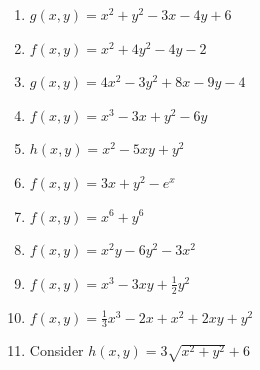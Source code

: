 \documentclass[12pt]{article}
\newif\ifans
\begin{document}
\begin{enumerate}

\item $g(x,y)=x^2+y^2-3x-4y+6$ 

\ifans{\fbox{Relative minimum at $\left(\frac{3}{2},2\right)$ }} \fi

\item $f(x,y)=x^2+4y^2-4y-2$ 

\ifans{\fbox{Relative minimum at $\left(0,\frac{1}{2}\right)$}} \fi

\item $g(x,y)=4x^2-3y^2+8x-9y-4$ 

\ifans{\fbox{Saddle point at $\left(-1,-\frac{3}{2}\right)$}} \fi

\item $f(x,y)=x^3-3x+y^2-6y$

\ifans{\fbox{Relative minimum at $(1,3)$; Saddle point at $(-1,3)$}} \fi

\item $h(x,y)=x^2-5xy+y^2$ 

\ifans{\fbox{Saddle point at $(0,0)$}} \fi

\item $f(x,y)=3x+y^2-e^x$

\ifans{\fbox{Saddle point at $(\ln{3},0)$}} \fi

\item $f(x,y)=x^6+y^6$

\ifans{\fbox{Relative minimum at $(0,0)$}} \fi

\item $f(x,y)=x^2y-6y^2-3x^2$

\ifans{\fbox{Relative maximum at $(0,0)$; Saddle points at $(6,3)$ and $(-6,3)$; Detailed Solution: \textcolor{blue}{\href{http://www.math.drexel.edu/classes/Calculus/resources/Math200HW/Solutions/15_200_Extrema_08.pdf}{Here}}}} \fi

\item $f(x,y)=x^3-3xy+\frac{1}{2}y^2$

\ifans{\fbox{Relative minimum at $(3,9)$; Saddle point at $(0,0)$}} \fi

\item $f(x,y)=\frac{1}{3}x^3-2x+x^2+2xy+y^2$

\ifans{\fbox{Relative minimum at $\left(\sqrt{2},-\sqrt{2}\right)$; Saddle point at $\left(-\sqrt{2},\sqrt{2}\right)$}} \fi

\item Consider $h(x,y)=3\sqrt{x^2+y^2}+6$


\end{enumerate}
\end{document}
